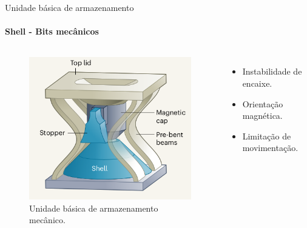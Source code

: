 \begin{frame}[t]{Unidade básica de armazenamento}
    \transboxout[duration=0.5]
    \framesubtitle{Shell - Bits mecânicos}
    \begin{columns}

        \begin{figure}[H]
            \centering
            \includegraphics[scale = 0.325]{source/pictures/shell.png}
            \caption{Unidade básica de armazenamento mecânico\cite{coulais2021snappy}.}
            \label{fig:uba}
        \end{figure}

            \begin{itemize}
                \item Instabilidade de encaixe.
                \item Orientação magnética.
                \item Limitação de movimentação.
            
            \end{itemize}
    \end{columns}
    
\end{frame}


